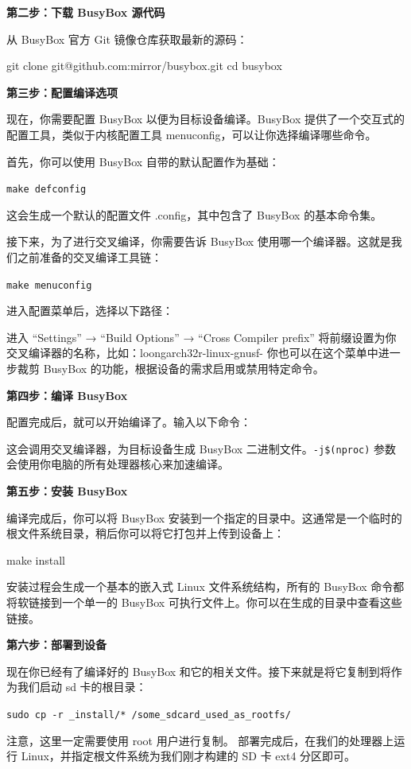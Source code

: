 \textbf{第二步：下载 BusyBox 源代码}

从 BusyBox 官方 Git 镜像仓库获取最新的源码：

\begin{CodeBlock}[language=BookShell]
git clone git@github.com:mirror/busybox.git
cd busybox
\end{CodeBlock}

\textbf{第三步：配置编译选项}

现在，你需要配置 BusyBox 以便为目标设备编译。BusyBox 提供了一个交互式的配置工具，类似于内核配置工具 menuconfig，可以让你选择编译哪些命令。

首先，你可以使用 BusyBox 自带的默认配置作为基础：

\texttt{make\ defconfig}

这会生成一个默认的配置文件 .config，其中包含了 BusyBox 的基本命令集。

接下来，为了进行交叉编译，你需要告诉 BusyBox 使用哪一个编译器。这就是我们之前准备的交叉编译工具链：

\texttt{make\ menuconfig}

进入配置菜单后，选择以下路径：

进入 ``Settings'' → ``Build Options'' → ``Cross Compiler prefix''
将前缀设置为你交叉编译器的名称，比如：loongarch32r-linux-gnusf-
你也可以在这个菜单中进一步裁剪 BusyBox 的功能，根据设备的需求启用或禁用特定命令。

\textbf{第四步：编译 BusyBox}

配置完成后，就可以开始编译了。输入以下命令：


这会调用交叉编译器，为目标设备生成 BusyBox 二进制文件。\texttt{-j\$(nproc)} 参数会使用你电脑的所有处理器核心来加速编译。

\textbf{第五步：安装 BusyBox}

编译完成后，你可以将 BusyBox 安装到一个指定的目录中。这通常是一个临时的根文件系统目录，稍后你可以将它打包并上传到设备上：

\begin{CodeBlock}[language=BookShell]
make install
\end{CodeBlock}

安装过程会生成一个基本的嵌入式 Linux 文件系统结构，所有的 BusyBox 命令都将软链接到一个单一的 BusyBox 可执行文件上。你可以在生成的目录中查看这些链接。

\textbf{第六步：部署到设备}

现在你已经有了编译好的 BusyBox 和它的相关文件。接下来就是将它复制到将作为我们启动 sd 卡的根目录：

\texttt{sudo\ cp\ -r\ \_install/*\ /some\_sdcard\_used\_as\_rootfs/}

注意，这里一定需要使用 root 用户进行复制。
部署完成后，在我们的处理器上运行 Linux，并指定根文件系统为我们刚才构建的 SD 卡 ext4 分区即可。
